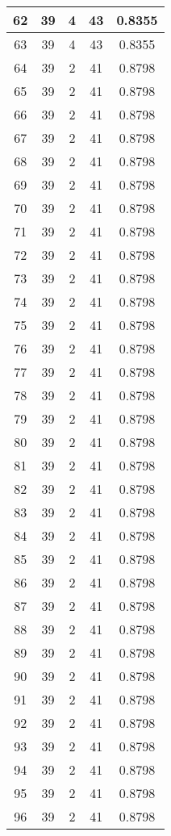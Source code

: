 \documentclass[letterpaper, 12pt]{article}
\begin{document}
\begin{longtable}{|c|c|c|c|c|}
\hline
62 & 39 & 4 & 43 & 0.8355 \\
\hline
63 & 39 & 4 & 43 & 0.8355 \\
\hline
64 & 39 & 2 & 41 & 0.8798 \\
\hline
65 & 39 & 2 & 41 & 0.8798 \\
\hline
66 & 39 & 2 & 41 & 0.8798 \\
\hline
67 & 39 & 2 & 41 & 0.8798 \\
\hline
68 & 39 & 2 & 41 & 0.8798 \\
\hline
69 & 39 & 2 & 41 & 0.8798 \\
\hline
70 & 39 & 2 & 41 & 0.8798 \\
\hline
71 & 39 & 2 & 41 & 0.8798 \\
\hline
72 & 39 & 2 & 41 & 0.8798 \\
\hline
73 & 39 & 2 & 41 & 0.8798 \\
\hline
74 & 39 & 2 & 41 & 0.8798 \\
\hline
75 & 39 & 2 & 41 & 0.8798 \\
\hline
76 & 39 & 2 & 41 & 0.8798 \\
\hline
77 & 39 & 2 & 41 & 0.8798 \\
\hline
78 & 39 & 2 & 41 & 0.8798 \\
\hline
79 & 39 & 2 & 41 & 0.8798 \\
\hline
80 & 39 & 2 & 41 & 0.8798 \\
\hline
81 & 39 & 2 & 41 & 0.8798 \\
\hline
82 & 39 & 2 & 41 & 0.8798 \\
\hline
83 & 39 & 2 & 41 & 0.8798 \\
\hline
84 & 39 & 2 & 41 & 0.8798 \\
\hline
85 & 39 & 2 & 41 & 0.8798 \\
\hline
86 & 39 & 2 & 41 & 0.8798 \\
\hline
87 & 39 & 2 & 41 & 0.8798 \\
\hline
88 & 39 & 2 & 41 & 0.8798 \\
\hline
89 & 39 & 2 & 41 & 0.8798 \\
\hline
90 & 39 & 2 & 41 & 0.8798 \\
\hline
91 & 39 & 2 & 41 & 0.8798 \\
\hline
92 & 39 & 2 & 41 & 0.8798 \\
\hline
93 & 39 & 2 & 41 & 0.8798 \\
\hline
94 & 39 & 2 & 41 & 0.8798 \\
\hline
95 & 39 & 2 & 41 & 0.8798 \\
\hline
96 & 39 & 2 & 41 & 0.8798 \\

\end{longtable}
\end{document}

